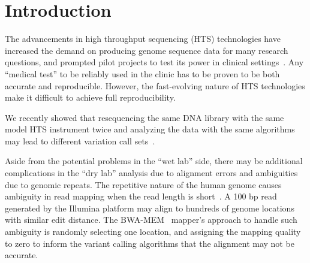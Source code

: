 \documentclass{bioinfo}
\newcommand{\junk}[1]{}
\begin{document}
\maketitle
\section{Introduction}

The advancements in high throughput sequencing (HTS) technologies have increased the demand on producing genome sequence data for many research questions, and prompted pilot projects to test its
power in clinical settings~\citep{Biesecker2009}. Any ``medical test'' to be reliably used in the clinic has to be proven to be both accurate and reproducible.
However, the fast-evolving nature of HTS technologies make it difficult to achieve full reproducibility. %

We recently showed that 
resequencing the same DNA library 
with the same model HTS instrument 
twice 
and analyzing the data with the same algorithms 
may lead to different variation call sets~\citep{Kavak2015}. 
\junk{
There may be multiple reasons for this effect,
such as degradation of DNA between two sequencing experiments, signal processing and base calling errors during sequencing, or different GC biases introduced while making sequencing libraries from the
same DNA~\citep{Kavak2015}. 
}
Aside from the potential problems in the ``wet lab'' side,
there may be additional complications in the ``dry lab'' analysis due to alignment errors and ambiguities due to genomic repeats.
The repetitive nature of the  human genome causes ambiguity in read mapping when the read length is short~\citep{Treangen2012}. A 100 bp read generated by the Illumina platform may align to hundreds of genome locations with similar edit distance. 
The BWA-MEM~\citep{Li2013} mapper's  approach to handle such ambiguity is randomly selecting one location, and assigning the mapping quality to zero to inform the variant calling algorithms that the alignment may not be accurate. 
\end{document}
